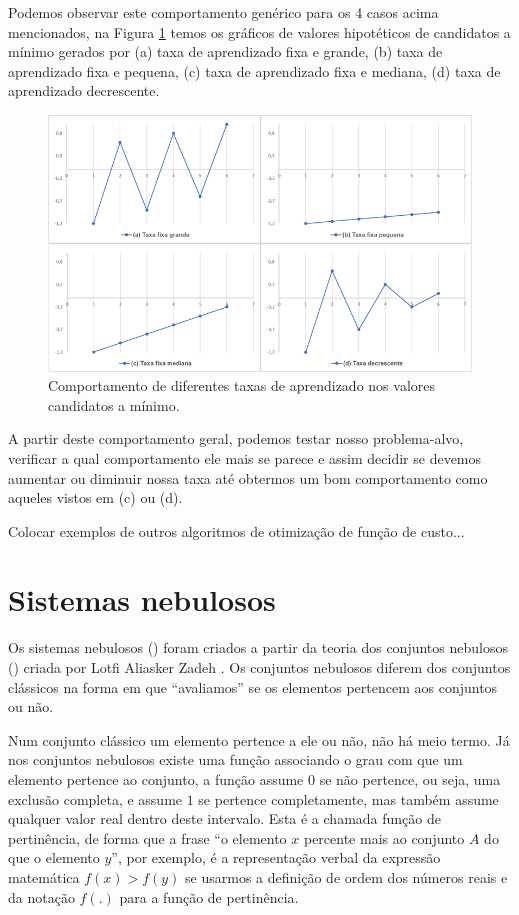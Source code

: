 Podemos observar este comportamento genérico para os 4 casos acima mencionados, na Figura \ref{fig:grad_4} temos os gráficos de valores hipotéticos de candidatos a mínimo gerados por (a) taxa de aprendizado fixa e grande, (b) taxa de aprendizado fixa e pequena, (c) taxa de aprendizado fixa e mediana, (d) taxa de aprendizado decrescente.

\begin{figure}[htb]
\centering
\includegraphics[width=14cm]{figuras/grad_4}
\caption{Comportamento de diferentes taxas de aprendizado nos valores candidatos a mínimo.}
\label{fig:grad_4}
\end{figure}

A partir deste comportamento geral, podemos testar nosso problema-alvo, verificar a qual comportamento ele mais se parece e assim decidir se devemos aumentar ou diminuir nossa taxa até obtermos um bom comportamento como aqueles vistos em (c) ou (d).

Colocar exemplos de outros algoritmos de otimização de função de custo...

\section{Sistemas nebulosos}

Os sistemas nebulosos () foram criados a partir da teoria dos conjuntos nebulosos () criada por Lotfi Aliasker Zadeh \citep{fuzzy_1}. Os conjuntos nebulosos diferem dos conjuntos clássicos na forma em que ``avaliamos'' se os elementos pertencem aos conjuntos ou não. 

Num conjunto clássico um elemento pertence a ele ou não, não há meio termo. Já nos conjuntos nebulosos existe uma função associando o grau com que um elemento pertence ao conjunto, a função assume $0$ se não pertence, ou seja, uma exclusão completa, e assume $1$ se pertence completamente, mas também assume qualquer valor real dentro deste intervalo. Esta é a chamada função de pertinência, de forma que a frase ``o elemento $x$ percente mais ao conjunto $A$ do que o elemento $y$'', por exemplo, é a representação verbal da expressão matemática $f(x) > f(y)$ se usarmos a definição de ordem dos números reais e da notação $f(.)$ para a função de pertinência.


